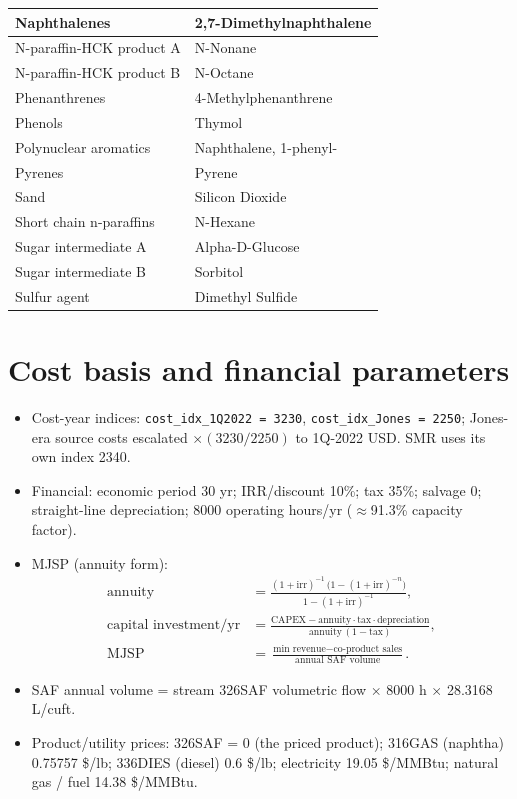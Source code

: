 \documentclass[11pt]{article}
\begin{document}
\begin{longtable}{|p{}|p{}|}
Naphthalenes & 2,7-Dimethylnaphthalene \\ \hline
N-paraffin-HCK product A & N-Nonane \\ \hline
N-paraffin-HCK product B & N-Octane \\ \hline
Phenanthrenes & 4-Methylphenanthrene \\ \hline
Phenols & Thymol \\ \hline
Polynuclear aromatics & Naphthalene, 1-phenyl- \\ \hline
Pyrenes & Pyrene \\ \hline
Sand & Silicon Dioxide \\ \hline
Short chain n-paraffins & N-Hexane \\ \hline
Sugar intermediate A & Alpha-D-Glucose \\ \hline
Sugar intermediate B & Sorbitol \\ \hline
Sulfur agent & Dimethyl Sulfide \\
\hline
\end{longtable}

\newcommand{\COtwo}{CO\textsubscript{2}}
\newcommand{\COtwoe}{CO\textsubscript{2}e}
\newcommand{\Htwo}{H\textsubscript{2}}
\newcommand{\NHthree}{NH\textsubscript{3}}
\newcommand{\code}[1]{\texttt{#1}}

\section{Cost basis and financial parameters}\label{sec:S1}

\begin{itemize}
  \item Cost-year indices: \code{cost\_idx\_1Q2022 = 3230}, \code{cost\_idx\_Jones = 2250};
    Jones-era source costs escalated $\times(3230/2250)$ to 1Q-2022 USD. SMR uses its own index 2340.
  \item Financial: economic period 30 yr; IRR/discount 10\%; tax 35\%; salvage 0; straight-line
    depreciation; 8000 operating hours/yr ($\approx$91.3\% capacity factor).
  \item MJSP (annuity form):
    \begin{align*}
      \text{annuity} &= \frac{(1+\text{irr})^{-1}\,\bigl(1-(1+\text{irr})^{-n}\bigr)}{1-(1+\text{irr})^{-1}},\\
      \text{capital investment/yr} &= \frac{\text{CAPEX} - \text{annuity}\cdot\text{tax}\cdot\text{depreciation}}{\text{annuity}\,(1-\text{tax})},\\
      \text{MJSP} &= \frac{\text{min revenue} - \text{co-product sales}}{\text{annual SAF volume}}.
    \end{align*}
  \item SAF annual volume = stream 326SAF volumetric flow $\times$ 8000 h $\times$ 28.3168 L/cuft.
  \item Product/utility prices: 326SAF = 0 (the priced product); 316GAS (naphtha) 0.75757 \$/lb;
    336DIES (diesel) 0.6 \$/lb; electricity 19.05 \$/MMBtu; natural gas / fuel 14.38 \$/MMBtu.
\end{itemize}
\end{document}
